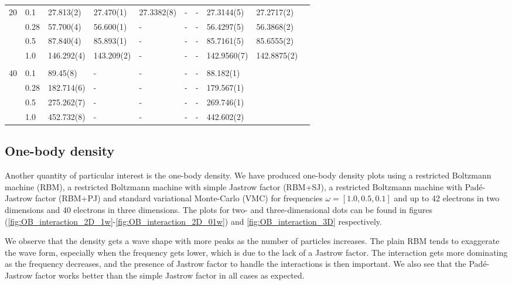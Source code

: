 {\begin{landscape}
\begin{table}
\begin{tabularx}{\hsize}{llR{2.3cm}R{2.3cm}R{2.3cm}R{2.3cm}R{2.3cm}R{2.3cm}R{2.3cm}R{2.2cm}}
		20 & 0.1 & 27.813(2) & 27.470(1) & 27.3382(8) & - & - & 27.3144(5) & 27.2717(2) \\ 
		& 0.28 & 57.700(4) & 56.600(1) & - & - & - & 56.4297(5) & 56.3868(2) \\
		& 0.5 & 87.840(4) & 85.893(1) & - & - & - & 85.7161(5) & 85.6555(2) \\
		& 1.0 & 146.292(4) & 143.209(2) & - & - & - & 142.9560(7) & 142.8875(2) \\ \hdashline \\
		
		40 & 0.1 & 89.45(8) & - & - & - & - & 88.182(1) \\ 
		& 0.28 & 182.714(6) & - & - & - & - & 179.567(1) \\
		& 0.5 & 275.262(7) & - & - & - & - & 269.746(1) \\
		& 1.0 & 452.732(8) & - & - & - & - & 442.602(2) \\ \hline\hline
	\end{tabularx}
\end{table}
\end{landscape}
}

\newpage
\subsection{One-body density}
Another quantity of particular interest is the one-body density. We have produced one-body density plots using a restricted Boltzmann machine (RBM), a restricted Boltzmann machine with simple Jastrow factor (RBM+SJ), a restricted Boltzmann machine with Padé-Jastrow factor (RBM+PJ) and standard variational Monte-Carlo (VMC) for frequencies $\omega=[1.0,0.5,0.1]$ and up to 42 electrons in two dimensions and 40 electrons in three dimensions. The plots for two- and three-dimensional dots can be found in figures (\ref{fig:OB_interaction_2D_1w}-\ref{fig:OB_interaction_2D_01w}) and \ref{fig:OB_interaction_3D} respectively.

We observe that the density gets a wave shape with more peaks as the number of particles increases. The plain RBM tends to exaggerate the wave form, especially when the frequency gets lower, which is due to the lack of a Jastrow factor. The interaction gets more dominating as the frequency decreases, and the presence of Jastrow factor to handle the interactions is then important. We also see that the Padé-Jastrow factor works better than the simple Jastrow factor in all cases as expected.

